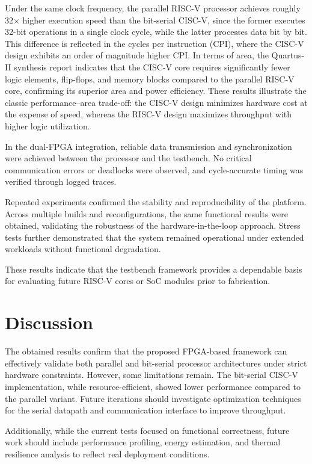 \documentclass[10pt,twocolumn]{article}
\begin{document}
Under the same clock frequency, the parallel RISC-V processor achieves roughly 32× higher execution speed than the bit-serial CISC-V, since the former executes 32-bit operations in a single clock cycle, while the latter processes data bit by bit. This difference is reflected in the cycles per instruction (CPI), where the CISC-V design exhibits an order of magnitude higher CPI. In terms of area, the Quartus-II synthesis report indicates that the CISC-V core requires significantly fewer logic elements, flip-flops, and memory blocks compared to the parallel RISC-V core, confirming its superior area and power efficiency. These results illustrate the classic performance–area trade-off: the CISC-V design minimizes hardware cost at the expense of speed, whereas the RISC-V design maximizes throughput with higher logic utilization.

In the dual-FPGA integration, reliable data transmission and synchronization were achieved between the processor and the testbench. No critical communication errors or deadlocks were observed, and cycle-accurate timing was verified through logged traces.

Repeated experiments confirmed the stability and reproducibility of the platform. Across multiple builds and reconfigurations, the same functional results were obtained, validating the robustness of the hardware-in-the-loop approach. Stress tests further demonstrated that the system remained operational under extended workloads without functional degradation.  

These results indicate that the testbench framework provides a dependable basis for evaluating future RISC-V cores or SoC modules prior to fabrication.

\section{Discussion}
The obtained results confirm that the proposed FPGA-based framework can effectively validate both parallel and bit-serial processor architectures under strict hardware constraints.  
However, some limitations remain. The bit-serial CISC-V implementation, while resource-efficient, showed lower performance compared to the parallel variant.  
Future iterations should investigate optimization techniques for the serial datapath and communication interface to improve throughput.  

Additionally, while the current tests focused on functional correctness, future work should include performance profiling, energy estimation, and thermal resilience analysis to reflect real deployment conditions.  
\end{document}
